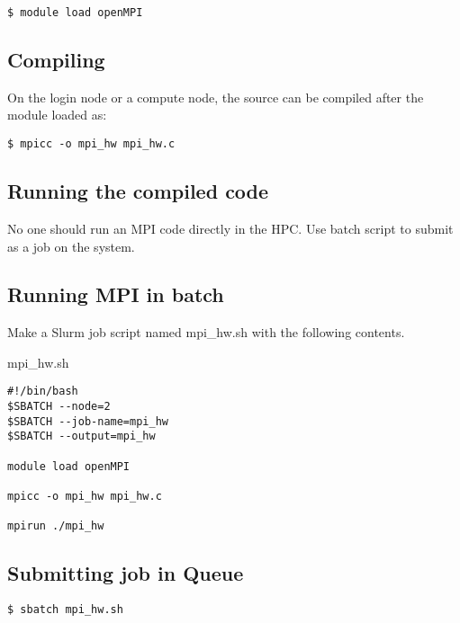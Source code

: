 \documentclass[11pt]{article}
\numberwithin{figure}{section}
\begin{document}
\begin{lstlisting}[frame=single]
$ module load openMPI
\end{lstlisting}

\subsection{Compiling}
On the login node or a compute node, the source can be compiled after the
module loaded as:

\begin{lstlisting}[frame=single]
$ mpicc -o mpi_hw mpi_hw.c
\end{lstlisting}

\subsection{Running the compiled code}
No one should run an MPI code directly in the HPC. Use batch script to submit
as a job on the system.

\subsection{Running MPI in batch}
Make a Slurm job script named mpi\_hw.sh with the following contents.

mpi\_hw.sh

\begin{lstlisting}[frame=single]
#!/bin/bash
$SBATCH --node=2
$SBATCH --job-name=mpi_hw
$SBATCH --output=mpi_hw

module load openMPI

mpicc -o mpi_hw mpi_hw.c

mpirun ./mpi_hw
\end{lstlisting}


\subsection{Submitting job in Queue}

\begin{lstlisting}[frame=single]
$ sbatch mpi_hw.sh
\end{lstlisting}
\end{document}
